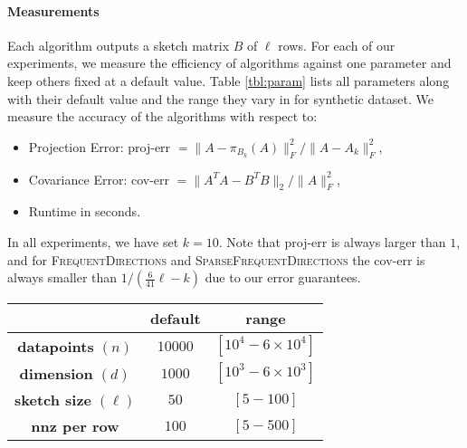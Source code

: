 \documentclass[11pt]{article}
\newcommand{\fd}{\textsc{FrequentDirections}\xspace}
\newcommand{\sfd}{\textsc{SparseFrequentDirections}\xspace}
\newcommand{\Paragraph}[1]{\paragraph*{\sffamily \textbf{#1}}}
\begin{document}
\Paragraph{Measurements} 
Each algorithm outputs a sketch matrix $B$ of $\ell$ rows.  For each of our experiments, we measure the efficiency of algorithms against one parameter and keep others fixed at a default value.
Table \ref{tbl:param} lists all parameters along with their default value and the range they vary in for synthetic dataset.
We measure the accuracy of the algorithms with respect to:
\begin{itemize}
\item Projection Error:  
\textsf{proj-err} $= \|A - \pi_{B_k}(A)\|_F^2 / \|A-A_k\|_F^2$,
\item Covariance Error: 
\textsf{cov-err} $= \|A^T A-B^T B\|_2 / \|A\|_F^2$,
\item Runtime in seconds. 
\end{itemize}
In all experiments, we have set $k = 10$. Note that \textsf{proj-err} is always larger than $1$, and for \fd and \sfd the \textsf{cov-err} is always smaller than $1/(\frac{6}{41} \ell-k)$ due to our error guarantees.



\begin{table*}[t!!!!]
\caption{Parameter values} \label{tbl:param}
\begin{center}
\begin{small}
\begin{sc}
\begin{tabular}{|c||c|c|}
\hline
 & \textbf{default} & \textbf{range} \\
\hline
\textbf{ datapoints }$(n)$ & $10000$ & $[10^4 - 6\times 10^4]$ \\
\hline
\textbf{dimension }$(d)$ & $1000$ & $[10^3 - 6\times 10^3]$ \\
\hline
\textbf{sketch size }$(\ell)$ & $50$ & $[5-100]$ \\
\hline
\textbf{nnz per row } & $100$ & $[5 - 500]$\\
\hline
\end{tabular}
\end{sc}
\end{small} 
\end{center}
\end{table*}
\end{document}
